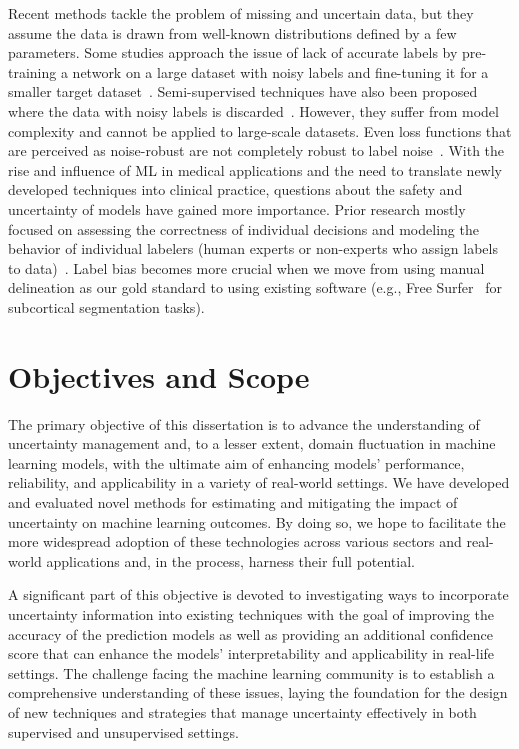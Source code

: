 Recent methods tackle the problem of missing and uncertain data, but they assume the data is drawn from well-known distributions defined by a few parameters. Some studies approach the issue of lack of accurate labels by pre-training a network on a large dataset with noisy labels and fine-tuning it for a smaller target dataset~\cite{oquab_Learning_2014}. Semi-supervised techniques have also been proposed where the data with noisy labels is discarded~\cite{zhu_Learning_2002}. However, they suffer from model complexity and cannot be applied to large-scale datasets. Even loss functions that are perceived as noise-robust are not completely robust to label noise~\cite{bartlett_Convexity_2006}. With the rise and influence of ML in medical applications and the need to translate newly developed techniques into clinical practice, questions about the safety and uncertainty of models have gained more importance. Prior research mostly focused on assessing the correctness of individual decisions and modeling the behavior of individual labelers (human experts or non-experts who assign labels to data)~\cite{raykar_Supervised_2009}. Label bias becomes more crucial when we move from using manual delineation as our gold standard to using existing software (e.g., Free Surfer~\cite{fischl_freesurfer_2012} for subcortical segmentation tasks).

\section{ Objectives and Scope}
The primary objective of this dissertation is to advance the understanding of uncertainty management and, to a lesser extent, domain fluctuation in machine learning models, with the ultimate aim of enhancing models' performance, reliability, and applicability in a variety of real-world settings. We have developed and evaluated novel methods for estimating and mitigating the impact of uncertainty on machine learning outcomes. By doing so, we hope to facilitate the more widespread adoption of these technologies across various sectors and real-world applications and, in the process, harness their full potential.

A significant part of this objective is devoted to investigating ways to incorporate uncertainty information into existing techniques with the goal of improving the accuracy of the prediction models as well as providing an additional confidence score that can enhance the models' interpretability and applicability in real-life settings. The challenge facing the machine learning community is to establish a comprehensive understanding of these issues, laying the foundation for the design of new techniques and strategies that manage uncertainty effectively in both supervised and unsupervised settings.

